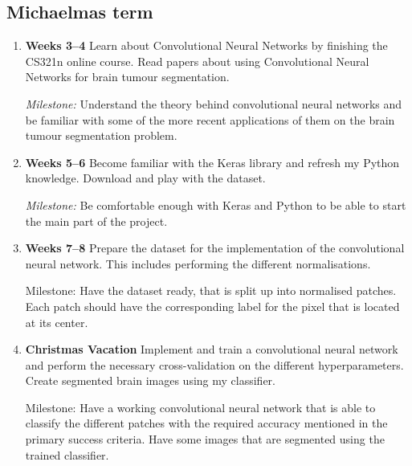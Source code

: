 \documentclass[12pt,a4paper,twoside]{article}
\begin{document}
\subsection*{Michaelmas term}
\begin{enumerate}
\item \textbf{Weeks 3--4} Learn about Convolutional Neural Networks by finishing the CS321n online course. Read papers about using Convolutional Neural Networks for brain tumour segmentation.

\emph{Milestone:} Understand the theory behind convolutional neural networks and be familiar with some of the more recent applications of them on the brain tumour segmentation problem.

\item \textbf{Weeks 5--6} Become familiar with the Keras library and refresh my Python knowledge. Download and play with the dataset.

\emph{Milestone:} Be comfortable enough with Keras and Python to be able to start the main part of the project.

\item \textbf{Weeks 7--8} Prepare the dataset for the implementation of the convolutional neural network. This includes performing the different normalisations.

{Milestone:} Have the dataset ready, that is split up into normalised patches. Each patch should have the corresponding label for the pixel that is located at its center.

\item \textbf{Christmas Vacation} Implement and train a convolutional neural network and perform the necessary cross-validation on the different hyperparameters. Create segmented brain images using my classifier.

{Milestone:} Have a working convolutional neural network that is able to classify the different patches with the required accuracy mentioned in the primary success criteria. Have some images that are segmented using the trained classifier.
\end{enumerate}
\end{document}
